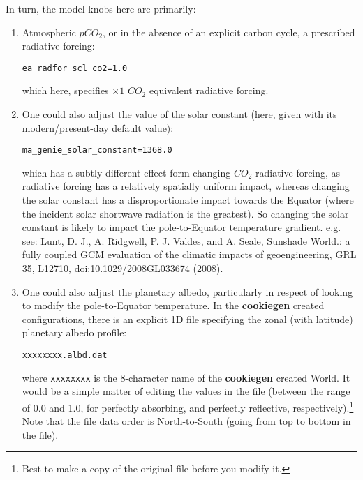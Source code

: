 \begin{enumerate}
\newpage
In turn, the model knobs here are primarily:
\vspace{1mm}
\begin{enumerate}
\vspace{1mm}
\item Atmospheric \(pCO_{2}\), or in the absence of an explicit carbon cycle, a prescribed radiative forcing:
\vspace{-2pt}\begin{verbatim}
ea_radfor_scl_co2=1.0
\end{verbatim}\vspace{-2pt}
which here, specifies \(\times1\) \(CO_{2}\) equivalent radiative forcing.
\vspace{1mm}
\item One could also adjust the value of the solar constant (here, given with its modern/present-day default value):
\vspace{-2pt}\begin{verbatim}
ma_genie_solar_constant=1368.0
\end{verbatim}\vspace{-2pt}
which has a subtly different effect form changing \(CO_{2}\) radiative forcing, as radiative forcing has a relatively spatially uniform impact, whereas changing the solar constant has a disproportionate impact towards the Equator (where the incident solar shortwave radiation is the greatest). So changing the solar constant is likely to impact the pole-to-Equator temperature gradient. e.g. see: Lunt, D. J., A. Ridgwell, P. J. Valdes, and A. Seale, Sunshade World.: a fully coupled GCM evaluation of the climatic impacts of geoengineering, GRL 35, L12710, doi:10.1029/2008GL033674 (2008).
\vspace{1mm}
\item One could also adjust the planetary albedo, particularly in respect of looking to modify the pole-to-Equator temperature. In the \textbf{cookiegen} created configurations, there is an explicit 1D file specifying the zonal (with latitude) planetary albedo profile:
\vspace{-2pt}\begin{verbatim}
xxxxxxxx.albd.dat
\end{verbatim}\vspace{-2pt}
where \texttt{xxxxxxxx} is the 8-character name of the \textbf{cookiegen} created World. It would be a simple matter of editing the values in the file (between the range of 0.0 and 1.0, for  perfectly absorbing, and perfectly reflective, respectively).\footnote{Best to make a copy of the original file before you modify it.} \uline{Note that the file data order is North-to-South (going from top to bottom in the file)}.
\end{enumerate}
\end{enumerate}
\vspace{2mm}

